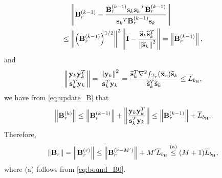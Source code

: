 \documentclass[10pt,twocolumn,journal]{IEEEtran}
\begin{document}
\begin{align}
&\hspace{-.1cm}\quad \,\norm{\bB_r^{(k-1)}-\frac{\bB_r^{(k-1)}\bs_k{\bs_k}^T\bB_r^{(k-1)}}{{\bs_k}^T\bB_r^{(k-1)}\bs_k}} \nn\\
&\hspace{-.1cm}\le \norm{\left(\bB_r^{(k-1)}\right)^{1/2}}^2\norm{\bI-\frac{\hatbs_k\hatbs_k^T}{\norm{\hatbs_k}^2}} = \norm{\bB_r^{(k-1)}},\nn%
\end{align}
and
\begin{align}
&\hspace{-.1cm}\quad\,\norm{\frac{\by_k\by_k^T}{\bs_k^T\by_k}} = \frac{\norm{\by_k}^2}{\bs_k^T\by_k} = \frac{\tilbs_k^T\nabla^2 f_{\calT_r}(\barbx_r)\tilbs_k}{\tilbs_k^T\tilbs_k} \le \barL_{b_\rmH},\label{eq:bound_B0}
\end{align}
we have from \eqref{eq:update_B} that %
\begin{equation}
\left\Vert\mathbf{B}_r^{(k)}\right\Vert \le \left\Vert\mathbf{B}_r^{(k-1)}\right\Vert + \left\Vert\frac{\mathbf{y}_k\mathbf{y}_k^T}{\mathbf{s}_k^T\mathbf{y}_k}\right\Vert\le \left\Vert\mathbf{B}_r^{(k-1)}\right\Vert + \overline{L}_{b_{\mathrm{H}}}.\nonumber 
\end{equation}
Therefore, 
\begin{align}
\left\Vert\mathbf{B}_r\right\Vert = \left\Vert\mathbf{B}_r^{(r)}\right\Vert \le \left\Vert\mathbf{B}_r^{(r-M')}\right\Vert + M'\overline{L}_{b_{\mathrm{H}}} \stackrel{\rm(a)}{\le} (M+1)\overline{L}_{b_{\mathrm{H}}},\nonumber
\end{align}
where (a) follows from \eqref{eq:bound_B0}. 
\end{document}

